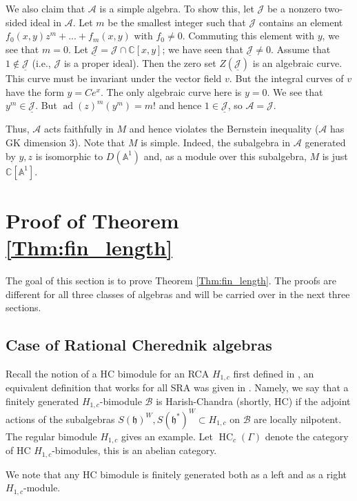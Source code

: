 \documentclass[12pt]{amsart}
\newcommand{\A}{\mathcal{A}}
\newcommand{\K}{\mathbb{C}}
\newcommand{\B}{\mathcal{B}}
\newcommand{\h}{\mathfrak{h}}
\newcommand{\C}{\mathbb{C}}
\theoremstyle{definition}
\begin{document}
We also claim that $\A$ is a simple algebra. To show this, let $\mathcal{J}$ be a nonzero two-sided ideal in $\A$.
Let $m$ be the smallest integer such that $\mathcal{J}$ contains an element $f_0(x,y)z^m+...+f_m(x,y)$
with $f_0\ne 0$. Commuting this element with $y$, we see that $m=0$. Let $\underline{\mathcal{J}}=\mathcal{J}\cap \C[x,y]$; we have seen that $\underline{\mathcal{J}}\neq 0$. Assume that $1\notin \underline{\mathcal{J}}$
(i.e., $\mathcal{J}$ is a proper ideal). Then the zero set $Z(\underline{\mathcal{J}})$ is an algebraic curve.
This curve must be invariant under the vector field $v$. But the integral curves of $v$ have the form
$y=Ce^x$. The only algebraic curve here is $y=0$. We see that $y^m\in \underline{\mathcal{J}}$. But
$\operatorname{ad}(z)^m (y^m)=m!$ and hence $1\in \underline{\mathcal{J}}$, so $\A=\mathcal{J}$.

Thus, $\A$ acts faithfully in $M$ and hence violates the Bernstein inequality ($\A$ has GK dimension 3).
Note that $M$ is simple. Indeed, the subalgebra in $\A$ generated by $y,z$ is isomorphic to
$D(\mathbb{A}^1)$ and, as a module over this subalgebra, $M$ is just $\K[\mathbb{A}^1]$.

\section{Proof of Theorem \ref{Thm:fin_length}}\label{S_fin_len}
The goal of this section is to prove Theorem \ref{Thm:fin_length}. The proofs are different for all
three classes of algebras and will be carried over in the next three sections.

\subsection{Case of Rational Cherednik algebras}\label{SS_RCA_fin}
Recall the notion of a HC bimodule for an RCA $H_{1,c}$ first defined in \cite{BEG},
an equivalent definition that works for all SRA was given in \cite{sraco}. Namely,
we say that a finitely generated $H_{1,c}$-bimodule $\B$ is Harish-Chandra
(shortly, HC) if the adjoint actions of the subalgebras $S(\h)^W, S(\h^*)^W\subset H_{1,c}$
on $\B$ are locally nilpotent. The regular bimodule $H_{1,c}$ gives an example.
Let $\operatorname{HC}_c(\Gamma)$ denote the category of HC $H_{1,c}$-bimodules,
this is an abelian category.

We note that any HC bimodule is finitely generated both as a left and as a right $H_{1,c}$-module.
\end{document}
